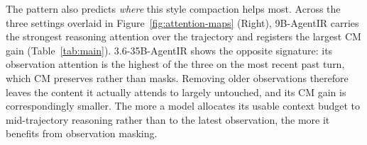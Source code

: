 The pattern also predicts \emph{where} this style compaction helps most. Across the three settings overlaid in Figure~\ref{fig:attention-maps} (Right), 9B-AgentIR carries the strongest reasoning attention over the trajectory and registers the largest CM gain (Table~\ref{tab:main}). 3.6-35B-AgentIR shows the opposite signature: its observation attention is the highest of the three on the most recent past turn, which CM preserves rather than masks. Removing older observations therefore leaves the content it actually attends to largely untouched, and its CM gain is correspondingly smaller. The more a model allocates its usable context budget to mid-trajectory reasoning rather than to the latest observation, the more it benefits from observation masking.





